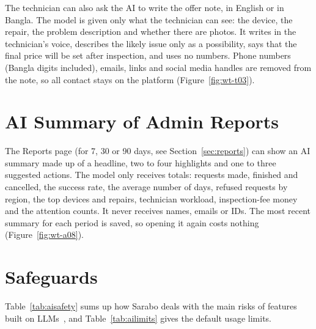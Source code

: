 \documentclass{standalone}
\begin{document}
The technician can also ask the AI to write the offer note, in English or in Bangla. The model is given only what the technician can see: the device, the repair, the problem description and whether there are photos. It writes in the technician's voice, describes the likely issue only as a possibility, says that the final price will be set after inspection, and uses no numbers. Phone numbers (Bangla digits included), emails, links and social media handles are removed from the note, so all contact stays on the platform (Figure~\ref{fig:wt-t03}).

\section{AI Summary of Admin Reports}
\label{sec:aisummary}
The Reports page (for 7, 30 or 90 days, see Section~\ref{sec:reports}) can show an AI summary made up of a headline, two to four highlights and one to three suggested actions. The model only receives totals: requests made, finished and cancelled, the success rate, the average number of days, refused requests by region, the top devices and repairs, technician workload, inspection-fee money and the attention counts. It never receives names, emails or IDs. The most recent summary for each period is saved, so opening it again costs nothing (Figure~\ref{fig:wt-a08}).

\section{Safeguards}
Table~\ref{tab:aisafety} sums up how Sarabo deals with the main risks of features built on LLMs~\cite{owaspllm}, and Table~\ref{tab:ailimits} gives the default usage limits.
\end{document}

